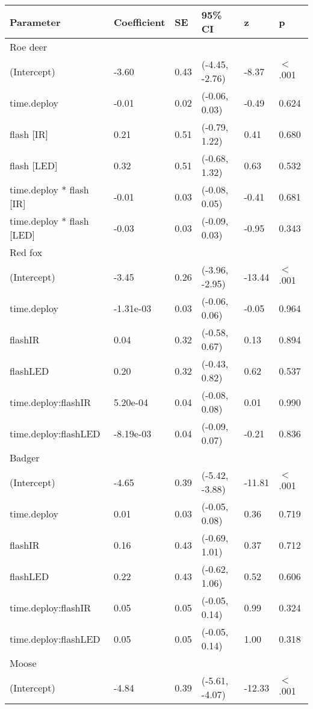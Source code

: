 \begin{table}[ht]
\centering
\begin{tabular}{llllll}
  \hline
Parameter & Coefficient & SE & 95\% CI & z & p \\ 
  \hline
Roe deer &  &  &  &  &        \\ 
  (Intercept) & -3.60 & 0.43 & (-4.45, -2.76) & -8.37 & $<$ .001 \\ 
  time.deploy & -0.01 & 0.02 & (-0.06,  0.03) & -0.49 & 0.624  \\ 
  flash [IR] & 0.21 & 0.51 & (-0.79,  1.22) & 0.41 & 0.680  \\ 
  flash [LED] & 0.32 & 0.51 & (-0.68,  1.32) & 0.63 & 0.532  \\ 
  time.deploy * flash [IR] & -0.01 & 0.03 & (-0.08,  0.05) & -0.41 & 0.681  \\ 
  time.deploy * flash [LED] & -0.03 & 0.03 & (-0.09,  0.03) & -0.95 & 0.343  \\ 
  Red fox &  &  &  &  &        \\ 
  (Intercept) & -3.45 & 0.26 & (-3.96, -2.95) & -13.44 & $<$ .001 \\ 
  time.deploy & -1.31e-03 & 0.03 & (-0.06,  0.06) & -0.05 & 0.964  \\ 
  flashIR & 0.04 & 0.32 & (-0.58,  0.67) & 0.13 & 0.894  \\ 
  flashLED & 0.20 & 0.32 & (-0.43,  0.82) & 0.62 & 0.537  \\ 
  time.deploy:flashIR & 5.20e-04 & 0.04 & (-0.08,  0.08) & 0.01 & 0.990  \\ 
  time.deploy:flashLED & -8.19e-03 & 0.04 & (-0.09,  0.07) & -0.21 & 0.836  \\ 
  Badger &  &  &  &  &        \\ 
  (Intercept) & -4.65 & 0.39 & (-5.42, -3.88) & -11.81 & $<$ .001 \\ 
  time.deploy & 0.01 & 0.03 & (-0.05,  0.08) & 0.36 & 0.719  \\ 
  flashIR & 0.16 & 0.43 & (-0.69,  1.01) & 0.37 & 0.712  \\ 
  flashLED & 0.22 & 0.43 & (-0.62,  1.06) & 0.52 & 0.606  \\ 
  time.deploy:flashIR & 0.05 & 0.05 & (-0.05,  0.14) & 0.99 & 0.324  \\ 
  time.deploy:flashLED & 0.05 & 0.05 & (-0.05,  0.14) & 1.00 & 0.318  \\ 
  Moose &  &  &  &  &        \\ 
  (Intercept) & -4.84 & 0.39 & (-5.61, -4.07) & -12.33 & $<$ .001 \\ 

\end{tabular}
\end{table}
